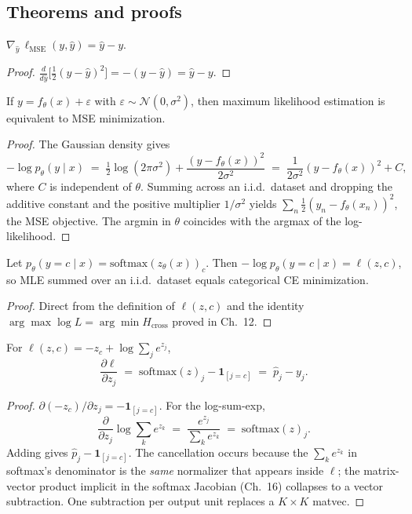 \subsection*{Theorems and proofs}

\begin{theorem}
$\nabla_{\hat y}\, \ell_{\mathrm{MSE}}(y, \hat y) = \hat y - y.$
\end{theorem}
\begin{proof}
$\frac{d}{d\hat y}\bigl[\tfrac12 (y-\hat y)^2\bigr] = -(y-\hat y) = \hat y - y$.
\end{proof}

\begin{theorem}[MSE = MLE under Gaussian noise]
If $y = f_\theta(x) + \varepsilon$ with $\varepsilon \sim \mathcal{N}(0, \sigma^2)$, then maximum likelihood
estimation is equivalent to MSE minimization.
\end{theorem}
\begin{proof}
The Gaussian density gives
\[
-\log p_\theta(y \mid x)
\;=\; \tfrac12 \log(2\pi\sigma^2) + \frac{(y - f_\theta(x))^2}{2\sigma^2}
\;=\; \frac{1}{2\sigma^2} (y - f_\theta(x))^2 + C,
\]
where $C$ is independent of $\theta$. Summing across an i.i.d.\ dataset and dropping the additive constant
and the positive multiplier $1/\sigma^2$ yields $\sum_n \tfrac12 (y_n - f_\theta(x_n))^2$, the MSE objective.
The argmin in $\theta$ coincides with the argmax of the log-likelihood.
\end{proof}

\begin{theorem}[Categorical CE = MLE under softmax]
Let $p_\theta(y = c \mid x) = \mathrm{softmax}(z_\theta(x))_c$. Then
$-\log p_\theta(y = c \mid x) = \ell(z, c)$, so MLE summed over an i.i.d.\ dataset equals categorical CE
minimization.
\end{theorem}
\begin{proof}
Direct from the definition of $\ell(z, c)$ and the identity $\arg\max \log L = \arg\min H_{\mathrm{cross}}$
proved in Ch.~12.
\end{proof}

\begin{theorem}
For $\ell(z, c) = -z_c + \log \sum_j e^{z_j}$,
\[
\frac{\partial \ell}{\partial z_j} \;=\; \mathrm{softmax}(z)_j - \mathbf{1}_{[j=c]} \;=\; \hat p_j - y_j.
\]
\end{theorem}
\begin{proof}
$\partial(-z_c)/\partial z_j = -\mathbf{1}_{[j=c]}$. For the log-sum-exp,
\[
\frac{\partial}{\partial z_j} \log \sum_k e^{z_k}
\;=\; \frac{e^{z_j}}{\sum_k e^{z_k}}
\;=\; \mathrm{softmax}(z)_j.
\]
Adding gives $\hat p_j - \mathbf{1}_{[j=c]}$. The cancellation occurs because the $\sum_k e^{z_k}$ in
softmax's denominator is the \emph{same} normalizer that appears inside $\ell$; the matrix-vector product
implicit in the softmax Jacobian (Ch.~16) collapses to a vector subtraction. One subtraction per output
unit replaces a $K \times K$ matvec.
\end{proof}

